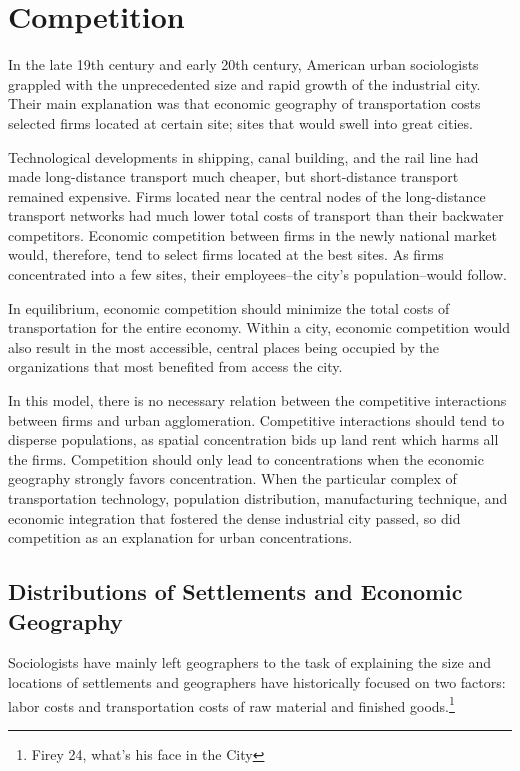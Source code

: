 \section*{Competition} 
In the late 19th century and early 20th century, American urban
sociologists grappled with the unprecedented size and rapid growth of
the industrial city. Their main explanation was that economic
geography of transportation costs selected firms located at certain site;
sites that would swell into great cities.

Technological developments in shipping, canal building, and the rail
line had made long-distance transport much cheaper, but short-distance
transport remained expensive. Firms located near the central nodes of
the long-distance transport networks had much lower total costs of
transport than their backwater competitors. Economic competition
between firms in the newly national market would, therefore, tend to
select firms located at the best sites. As firms concentrated into a
few sites, their employees--the city's population--would follow.

In equilibrium, economic competition should minimize the total costs
of transportation for the entire economy.  Within a city, economic
competition would also result in the most accessible, central places
being occupied by the organizations that most benefited from
access the city.

In this model, there is no necessary relation between the competitive
interactions between firms and urban agglomeration. Competitive
interactions should tend to disperse populations, as spatial
concentration bids up land rent which harms all the firms. Competition
should only lead to concentrations when the economic geography
strongly favors concentration. When the particular complex of
transportation technology, population distribution, manufacturing
technique, and economic integration that fostered the dense industrial
city passed, so did competition as an explanation for urban
concentrations.

\subsection*{Distributions of Settlements and Economic Geography}
Sociologists have mainly left geographers to the task of explaining
the size and locations of settlements and geographers have
historically focused on two factors: labor costs and transportation
costs of raw material and finished goods.\footnote{Firey 24, what's
  his face in the City}

